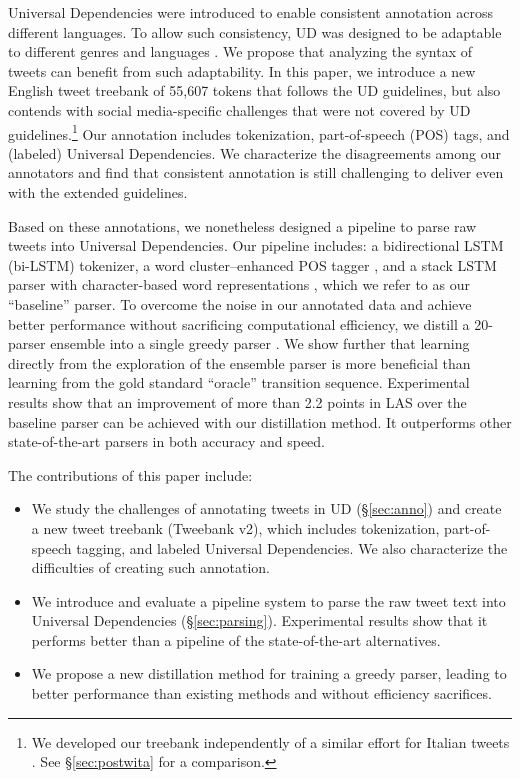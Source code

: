 \documentclass[11pt,a4paper]{article}
\begin{document}
Universal Dependencies \citep[UD]{NIVRE16.348} were introduced to enable
consistent annotation across different languages. To allow such
consistency, UD was designed to be adaptable to different genres \cite{wang-EtAl:2017:Long6} 
and languages \cite{guo-EtAl:2015:ACL-IJCNLP2,TACL892}. We propose that analyzing
the syntax of tweets can benefit from such adaptability. In this paper,
we introduce a new English tweet treebank of 55,607 tokens that follows the UD
guidelines, but also contends with social media-specific challenges that were not
covered by UD guidelines.\footnote{We developed our treebank independently of a similar effort for Italian tweets \cite{sanguinetti-17}. 
See \S\ref{sec:postwita} for a comparison.} Our annotation includes 
tokenization, part-of-speech (POS) tags, and (labeled) Universal Dependencies.
We characterize the disagreements among our annotators and find that
consistent annotation is still challenging to deliver even with
the extended guidelines.



Based on these annotations, we nonetheless designed a pipeline to parse 
raw tweets into Universal Dependencies. Our pipeline includes: a
bidirectional LSTM (bi-LSTM) tokenizer, a word cluster--enhanced POS
tagger \citep[following][]{owoputi-EtAl:2013:NAACL-HLT}, and a stack LSTM parser
with character-based word representations
\cite{ballesteros-dyer-smith:2015:EMNLP}, which we refer to as our
``baseline'' parser.
To overcome the noise in our annotated data and achieve better performance
without sacrificing computational efficiency, we 
distill a 20-parser ensemble into a single greedy  parser 
\cite{DBLP:journals/corr/HintonVD15}.
We show further  that learning directly from the exploration of the ensemble parser
is more beneficial than learning from the gold standard ``oracle''
transition sequence. Experimental results show that an improvement of more
than 2.2 points in LAS over the
baseline parser can be achieved with our distillation method.  It outperforms
other state-of-the-art parsers in both accuracy and speed.

The contributions of this paper include:
\begin{itemize}
\item We study the challenges of annotating tweets in UD (\S\ref{sec:anno})
and create a new tweet treebank ({\sc Tweebank v2}), which includes 
tokenization, part-of-speech tagging, and labeled Universal Dependencies.
We also characterize the difficulties of creating such annotation.

\item We introduce and evaluate a pipeline system to parse the raw tweet text into
Universal Dependencies (\S\ref{sec:parsing}).  Experimental results show
that it performs better than a pipeline of the state-of-the-art alternatives.

\item We propose a new distillation
method for training a greedy parser, leading to better performance
than existing methods and without efficiency sacrifices.
\end{itemize}
\end{document}
